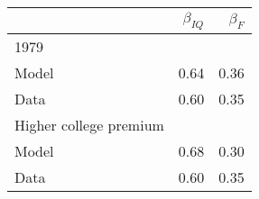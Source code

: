 \begin{tabular}{lrr}
\hline
  & $\beta_{IQ}$  & $\beta_{F}$  \\ 
\hline
1979 &   &   \\ 
Model & 0.64  & 0.36  \\ 
Data & 0.60  & 0.35  \\ 
Higher college premium &   &   \\ 
Model & 0.68  & 0.30  \\ 
Data & 0.60  & 0.35  \\ 
\hline
\end{tabular}%

